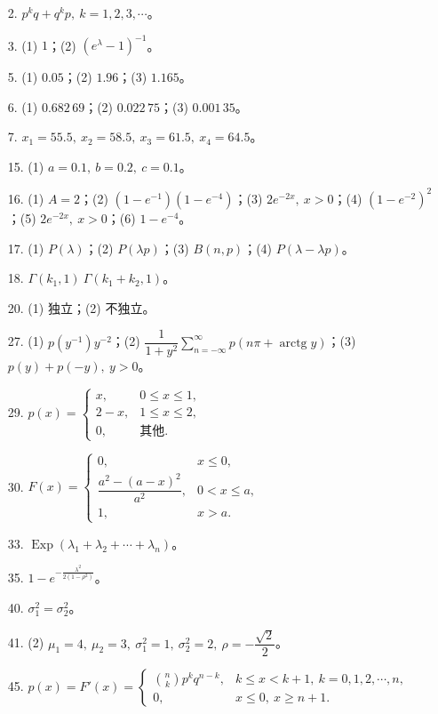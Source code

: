 \documentclass[../main.tex]{subfiles}
\begin{document}
\begin{enumerate}
\item[2.] $p^{k}q+q^{k}p,\ k=1,2,3,\cdots$。
\item[3.] (1) $1$；(2) $(e^{\lambda}-1)^{-1}$。
\item[5.] (1) $0.05$；(2) $1.96$；(3) $1.165$。
\item[6.] (1) $0.682\,69$；(2) $0.022\,75$；(3) $0.001\,35$。
\item[7.] $x_1=55.5,\ x_2=58.5,\ x_3=61.5,\ x_4=64.5$。
\item[15.] (1) $a=0.1,\ b=0.2,\ c=0.1$。
\item[16.] (1) $A=2$；(2) $(1-e^{-1})(1-e^{-4})$；(3) $2e^{-2x},\ x>0$；(4) $(1-e^{-2})^{2}$；(5) $2e^{-2x},\ x>0$；(6) $1-e^{-4}$。
\item[17.] (1) $P(\lambda)$；(2) $P(\lambda p)$；(3) $B(n,p)$；(4) $P(\lambda-\lambda p)$。
\item[18.] $\Gamma(k_1,1)\ \Gamma(k_1+k_2,1)$。
\item[20.] (1) 独立；(2) 不独立。
\item[27.] (1) $p(y^{-1})y^{-2}$；(2) $\dfrac{1}{1+y^{2}}\displaystyle\sum_{n=-\infty}^{\infty}p(n\pi+\operatorname{arctg} y)$；(3) $p(y)+p(-y),\ y>0$。
\item[29.] $p(x)=
\begin{cases}
x, & 0\leqslant x\leqslant 1,\\
2-x, & 1\leqslant x\leqslant 2,\\
0, & \text{其他}.
\end{cases}$
\item[30.] $F(x)=
\begin{cases}
0, & x\leqslant 0,\\
\dfrac{a^{2}-(a-x)^{2}}{a^{2}}, & 0<x\leqslant a,\\
1, & x>a.
\end{cases}$
\item[33.] $\operatorname{Exp}(\lambda_1+\lambda_2+\cdots+\lambda_n)$。
\item[35.] $1-e^{-\frac{\lambda^{2}}{2(1-\rho^{2})}}$。
\item[40.] $\sigma_1^{2}=\sigma_2^{2}$。
\item[41.] (2) $\mu_1=4,\ \mu_2=3,\ \sigma_1^{2}=1,\ \sigma_2^{2}=2,\ \rho=-\dfrac{\sqrt{2}}{2}$。
\item[45.] $p(x)=F'(x)=
\begin{cases}
\binom{n}{k}p^{k}q^{n-k}, & k\leqslant x<k+1,\ k=0,1,2,\cdots,n,\\
0, & x\leqslant 0,\ x\geqslant n+1.
\end{cases}$
\end{enumerate}
\end{document}

